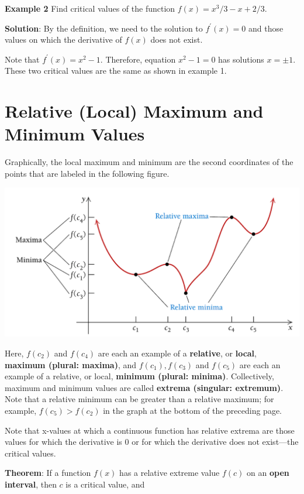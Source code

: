 \documentclass[
]{book}
\begin{document}
\textbf{Example 2} Find critical values of the function \(f(x) = x^3/3 - x + 2/3\).

\textbf{Solution}: By the definition, we need to the solution to \(f^\prime(x) = 0\) and those values on which the derivative of \(f(x)\) does not exist.

Note that \(f^\prime(x) = x^2 - 1\). Therefore, equation \(x^2 -1 = 0\) has solutions \(x = \pm 1\). These two critical values are the same as shown in example 1.

\hfill\break

\hypertarget{relative-local-maximum-and-minimum-values}{%
\section{Relative (Local) Maximum and Minimum Values}\label{relative-local-maximum-and-minimum-values}}

Graphically, the local maximum and minimum are the second coordinates of the points that are labeled in the following figure.

\begin{center}\includegraphics[width=0.6\linewidth]{img07/w07-localMinMax} \end{center}

Here, \(f(c_2)\) and \(f(c_4)\) are each an example of a \textbf{relative}, or \textbf{local}, \textbf{maximum (plural: maxima)}, and \(f(c_1), f(c_3)\) and \(f(c_5)\) are each an example of a relative, or local, \textbf{minimum (plural: minima)}. Collectively, maximum and minimum values are called \textbf{extrema (singular: extremum)}. Note that a relative minimum can be greater than a relative maximum; for example, \(f(c_5) > f(c_2)\) in the graph at the bottom of the preceding page.

Note that x-values at which a continuous function has relative extrema are those values for which the derivative is 0 or for which the derivative does not exist---the critical values.

\hfill\break
\textbf{Theorem}: If a function \(f(x)\) has a relative extreme value \(f(c)\) on an \textbf{open interval}, then \(c\) is a critical value, and
\end{document}
